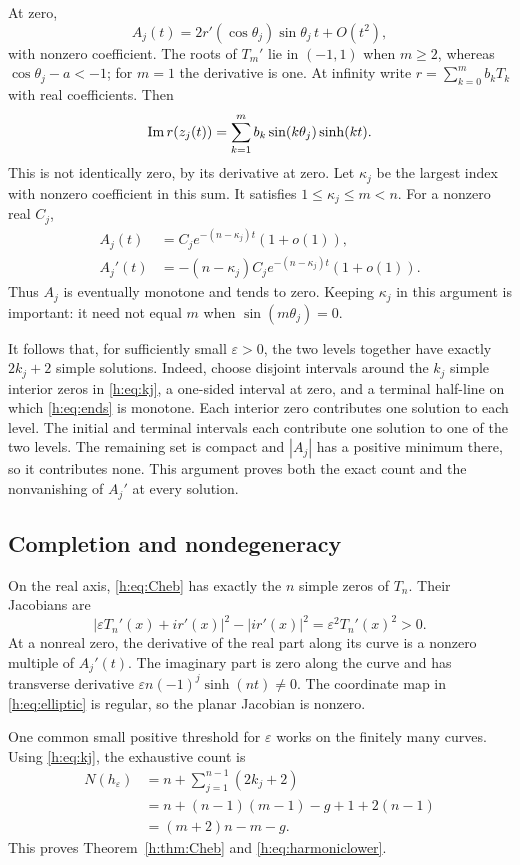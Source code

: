 \documentclass[UTF8,11pt]{ctexart}
\theoremstyle{definition}
\numberwithin{equation}{section}
\newcommand{\eps}{\varepsilon}\newcommand{\ep}{\varepsilon}
\begin{document}
At zero,
\[
 A_j(t)=2r'(\cos\theta_j)\sin\theta_j\,t+O(t^2),
\]
with nonzero coefficient. The roots of $T_m'$ lie in $(-1,1)$ when
$m\ge2$, whereas $\cos\theta_j-a<-1$; for $m=1$ the derivative is one.
At infinity write $r=\sum_{k=0}^m b_kT_k$ with real coefficients.
Then
\[
 \operatorname{Im} r(z_j(t))=\sum_{k=1}^m b_k\sin(k\theta_j)\sinh(kt).
\]
This is not identically zero, by its derivative at zero. Let
$\kappa_j$ be the largest index with nonzero coefficient in this sum.
It satisfies $1\le\kappa_j\le m<n$. For a nonzero real $C_j$,
\begin{equation}\label{h:eq:ends}
 \begin{split}
 A_j(t)&=C_j e^{-(n-\kappa_j)t}(1+o(1)),\\
 A_j'(t)&=-(n-\kappa_j)C_j e^{-(n-\kappa_j)t}(1+o(1)).
 \end{split}
\end{equation}
Thus $A_j$ is eventually monotone and tends to zero. Keeping
$\kappa_j$ in this argument is important: it need not equal $m$ when
$\sin(m\theta_j)=0$.

It follows that, for sufficiently small $\eps>0$, the two levels together
have exactly $2k_j+2$ simple solutions. Indeed, choose disjoint intervals
around the $k_j$ simple interior zeros in \eqref{h:eq:kj}, a one-sided
interval at zero, and a terminal half-line on which \eqref{h:eq:ends} is
monotone. Each interior zero contributes one solution to each level.
The initial and terminal intervals each contribute one solution to one
of the two levels. The remaining set is compact and $|A_j|$ has a
positive minimum there, so it contributes none. This argument proves
both the exact count and the nonvanishing of $A_j'$ at every solution.

\subsection{Completion and nondegeneracy}
On the real axis, \eqref{h:eq:Cheb} has exactly the $n$ simple zeros of $T_n$.
Their Jacobians are
\[
 |\eps T_n'(x)+ir'(x)|^2-|ir'(x)|^2=\eps^2T_n'(x)^2>0.
\]
At a nonreal zero, the derivative of the real part along its curve is
a nonzero multiple of $A_j'(t)$. The imaginary part is zero along the
curve and has transverse derivative
$\eps n(-1)^j\sinh(nt)\ne0$. The coordinate map in \eqref{h:eq:elliptic}
is regular, so the planar Jacobian is nonzero.

One common small positive threshold for $\eps$ works on the finitely
many curves. Using \eqref{h:eq:kj}, the exhaustive count is
\[
 \begin{split}
 N(h_\eps)
 &=n+\sum_{j=1}^{n-1}(2k_j+2)\\
 &=n+(n-1)(m-1)-g+1+2(n-1)\\
 &=(m+2)n-m-g.
 \end{split}
\]
This proves Theorem~\ref{h:thm:Cheb} and \eqref{h:eq:harmoniclower}.
\end{document}
